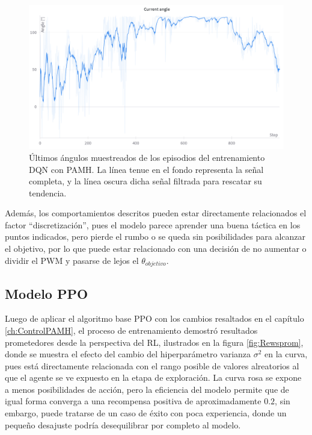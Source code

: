 \begin{figure}[hh]
	\centering
	\includegraphics[scale=0.43]{fig/new/DQNentrenadosang.png}
	\caption{Últimos ángulos muestreados de los episodios del entrenamiento DQN con PAMH. La línea tenue en el fondo representa la señal completa, y la línea oscura dicha señal filtrada para rescatar su tendencia.}
	\label{fig:AnglepromDQN}
\end{figure}

Además, los comportamientos descritos pueden estar directamente relacionados el factor ``discretización'', pues el modelo parece aprender una buena táctica en los puntos indicados, pero pierde el rumbo o se queda sin posibilidades para alcanzar el objetivo, por lo que puede estar relacionado con una decisión de no aumentar o dividir el PWM y pasarse de lejos el $\theta_{objetivo}$.


\subsection{Modelo PPO}

Luego de aplicar el algoritmo base PPO con los cambios resaltados en el capítulo \ref{ch:ControlPAMH}, el proceso de entrenamiento demostró resultados prometedores desde la perspectiva del RL, ilustrados en la figura \ref{fig:Rewsprom}, donde se muestra el efecto del cambio del hiperparámetro varianza $\sigma^2$ en la curva, pues está directamente relacionada con el rango posible de valores alreatorios al que el agente se ve expuesto en la etapa de exploración. La curva rosa se expone a menos posibilidades de acción, pero la eficiencia del modelo permite que de igual forma converga a una recompensa positiva de aproximadamente $0.2$, sin embargo, puede tratarse de un caso de éxito con poca experiencia, donde un  pequeño desajuste podría desequilibrar por completo al modelo. 

